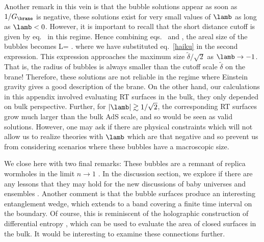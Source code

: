 Another remark in this vein is that the bubble solutions appear as soon as $1/G_\brane$ is negative, \ie these solutions  exist for very small values of $\lamb$ as long as $\lamb<0$. However, it is important to recall that the short distance cutoff is given by eq.~ in this regime. Hence combining  eqs.~ and ,  the areal size of the bubbles becomes
\beq
L\pbo=\simeq {}\,\tilde\delta\,.
\label{haiku2}
\eeq 
where we have substituted eq.~\eqref{haiku} in the second expression.
This expression approaches the maximum size $\tilde\delta/\sqrt{2}$ as $\lamb\to-1$. That is, the radius of bubbles is always smaller than the cutoff scale $\tilde\delta$ on the brane! Therefore, these solutions are not reliable in the regime where Einstein gravity gives a good description of the brane.  On the other hand, our calculations in this appendix involved evaluating RT surfaces in the bulk, \ie they only depended on bulk perspective. Further, for $|\lamb|\gtrsim1/\sqrt{2}$, the corresponding RT surfaces grow much larger than the bulk AdS scale, and so would be seen as valid solutions. 
However, one may ask if there are physical constraints which will not allow us to realize theories with $\lamb$ which are that negative and so prevent us from considering scenarios where these bubbles have a macroscopic size. 

We close here with two final remarks: These bubbles are a remnant of replica wormholes in the limit $n\to1$ \cite{Penington:2019kki,Hartman:2020swn}. In the discussion section, we explore if there are any lessons that they may hold for the new discussions of baby universes and ensembles \cite{Marolf:2020xie}. Another comment is that the bubble surfaces produce an interesting
entanglement wedge, which extends to a band  covering a finite time interval on the boundary. Of course, this is reminiscent of the holographic construction of differential entropy \cite{Balasubramanian:2013rqa,Balasubramanian:2013lsa,Czech:2014wka,Myers:2014jia,Headrick:2014eia}, which can be used to evaluate the area of closed surfaces in the bulk. It would be interesting to examine these connections further.


